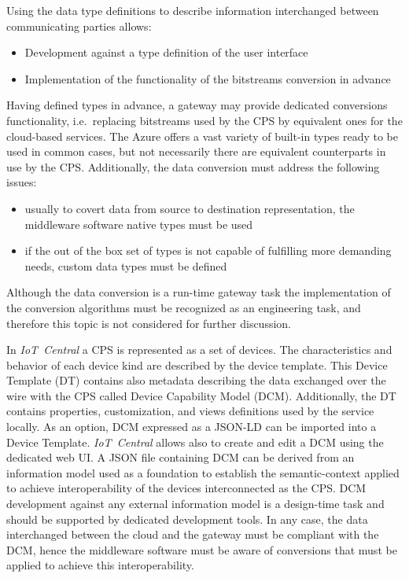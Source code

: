 \documentclass{jacsart}
\begin{document}
Using the data type definitions to describe information interchanged
between communicating parties allows:

\begin{itemize}
      \item Development against a type definition of the user interface
      \item Implementation of the functionality of the bitstreams conversion in advance
\end{itemize}

Having defined types in advance, a gateway may provide dedicated conversions functionality, i.e.~replacing bitstreams used by the CPS by equivalent ones for the cloud-based services. The Azure offers a vast variety of built-in types ready to be used in common cases, but not necessarily there are equivalent counterparts in use by the CPS. Additionally, the data conversion must address the following issues:

\begin{itemize}
      \item usually to covert data from source to destination representation, the middleware software native types must be used
      \item if the out of the box set of types is not capable of fulfilling more demanding needs, custom data types must be defined
\end{itemize}

Although the data conversion is a run-time gateway task the
implementation of the conversion algorithms must be recognized as an
engineering task, and therefore this topic is not considered for further
discussion.

In \textit{IoT\ Central} a CPS is represented as a set
of devices. The characteristics and behavior of each device kind are
described by the device template. This Device Template (DT) contains
also metadata describing the data exchanged over the
wire with the CPS called Device Capability Model
(DCM). Additionally, the DT contains properties, customization, and
views definitions used by the service locally. As an option, DCM
expressed as a JSON-LD can be imported into a Device Template.
\textit{IoT\ Central} allows also to create and edit a DCM using the
dedicated web UI. A JSON file containing DCM can be derived from an
information model used as a foundation to establish the semantic-context
applied to achieve interoperability of the devices interconnected as the
CPS. DCM development against any external information
model is a design-time task and should be supported by dedicated
development tools. In any case, the data interchanged between the cloud
and the gateway must be compliant with the DCM, hence the middleware
software must be aware of conversions that must be applied to achieve
this interoperability.
\end{document}
